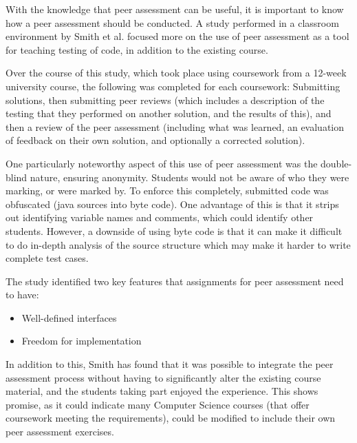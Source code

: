 \documentclass[a4paper,11pt]{report}
\begin{document}
With the knowledge that peer assessment can be useful, it is important to know how a peer assessment should be conducted. A study performed in a classroom environment by Smith et al.\cite{smith_using_2012} focused more on the use of peer assessment as a tool for teaching testing of code, in addition to the existing course.\par
Over the course of this study, which took place using coursework from a 12-week university course, the following was completed for each coursework: Submitting solutions, then submitting peer reviews (which includes a description of the testing that they performed on another solution, and the results of this), and then a review of the peer assessment (including what was learned, an evaluation of feedback on their own solution, and optionally a corrected solution).\par
One particularly noteworthy aspect of this use of peer assessment was the double-blind nature, ensuring anonymity. Students would not be aware of who they were marking, or were marked by. To enforce this completely, submitted code was obfuscated (java sources into byte code). One advantage of this is that it strips out identifying variable names and comments, which could identify other students. However, a downside of using byte code is that it can make it difficult to do in-depth analysis of the source structure which may make it harder to write complete test cases.\par
The study identified two key features that assignments for peer assessment need to have:
\begin{itemize}
 \item Well-defined interfaces
 \item Freedom for implementation
\end{itemize}
In addition to this, Smith has found that it was possible to integrate the peer assessment process without having to significantly alter the existing course material, and the students taking part enjoyed the experience. This shows promise, as it could indicate many Computer Science courses (that offer coursework meeting the requirements), could be modified to include their own peer assessment exercises.\par
\end{document}
